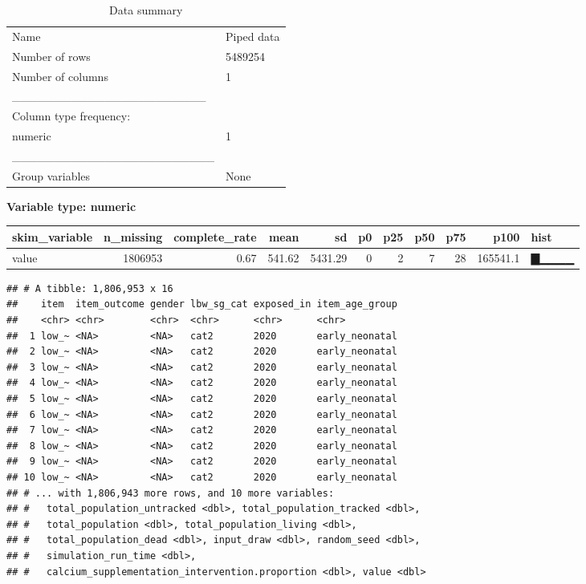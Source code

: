 \documentclass[]{article}
\newenvironment{Shaded}{\begin{snugshade}}{\end{snugshade}}
\newcommand{\DecValTok}[1]{\textcolor[rgb]{0.00,0.00,0.81}{#1}}
\newcommand{\KeywordTok}[1]{\textcolor[rgb]{0.13,0.29,0.53}{\textbf{#1}}}
\newcommand{\NormalTok}[1]{#1}
\newcommand{\OperatorTok}[1]{\textcolor[rgb]{0.81,0.36,0.00}{\textbf{#1}}}
\newcommand{\StringTok}[1]{\textcolor[rgb]{0.31,0.60,0.02}{#1}}
\begin{document}
\begin{Shaded}
\end{Shaded}

\begin{longtable}[]{@{}ll@{}}
\caption{Data summary}\tabularnewline
\toprule
\endhead
Name & Piped data\tabularnewline
Number of rows & 5489254\tabularnewline
Number of columns & 1\tabularnewline
\_\_\_\_\_\_\_\_\_\_\_\_\_\_\_\_\_\_\_\_\_\_\_ &\tabularnewline
Column type frequency: &\tabularnewline
numeric & 1\tabularnewline
\_\_\_\_\_\_\_\_\_\_\_\_\_\_\_\_\_\_\_\_\_\_\_\_ &\tabularnewline
Group variables & None\tabularnewline
\bottomrule
\end{longtable}

\textbf{Variable type: numeric}

\begin{longtable}[]{@{}lrrrrrrrrrl@{}}
\toprule
skim\_variable & n\_missing & complete\_rate & mean & sd & p0 & p25 &
p50 & p75 & p100 & hist\tabularnewline
\midrule
\endhead
value & 1806953 & 0.67 & 541.62 & 5431.29 & 0 & 2 & 7 & 28 & 165541.1 &
▇▁▁▁▁\tabularnewline
\bottomrule
\end{longtable}

\begin{Shaded}
\end{Shaded}

\begin{verbatim}
## # A tibble: 1,806,953 x 16
##    item  item_outcome gender lbw_sg_cat exposed_in item_age_group
##    <chr> <chr>        <chr>  <chr>      <chr>      <chr>         
##  1 low_~ <NA>         <NA>   cat2       2020       early_neonatal
##  2 low_~ <NA>         <NA>   cat2       2020       early_neonatal
##  3 low_~ <NA>         <NA>   cat2       2020       early_neonatal
##  4 low_~ <NA>         <NA>   cat2       2020       early_neonatal
##  5 low_~ <NA>         <NA>   cat2       2020       early_neonatal
##  6 low_~ <NA>         <NA>   cat2       2020       early_neonatal
##  7 low_~ <NA>         <NA>   cat2       2020       early_neonatal
##  8 low_~ <NA>         <NA>   cat2       2020       early_neonatal
##  9 low_~ <NA>         <NA>   cat2       2020       early_neonatal
## 10 low_~ <NA>         <NA>   cat2       2020       early_neonatal
## # ... with 1,806,943 more rows, and 10 more variables:
## #   total_population_untracked <dbl>, total_population_tracked <dbl>,
## #   total_population <dbl>, total_population_living <dbl>,
## #   total_population_dead <dbl>, input_draw <dbl>, random_seed <dbl>,
## #   simulation_run_time <dbl>,
## #   calcium_supplementation_intervention.proportion <dbl>, value <dbl>
\end{verbatim}
\end{document}
